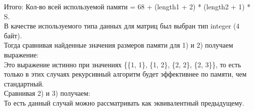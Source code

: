 Итого: Кол-во всей используемой памяти = 68 + (length1 + 2) * (length2 + 1) * S. \\
В качестве используемого типа данных для матриц был выбран тип integer (4 байт). \\
Тогда сравнивая найденные значения размеров памяти для 1) и 2) получаем выражение: \\
Это выражение истинно при значениях \{\{1, 1\}, \{1, 2\}, \{2, 2\}, \{2, 3\}\}, то есть только в этих случаях рекурсивный алгоритм будет эффективнее по памяти, чем стандартный. \\
Сравнивая 2) и 3) получаем: \\
То есть данный случай можно рассматривать как эквивалентный предыдущему. \\